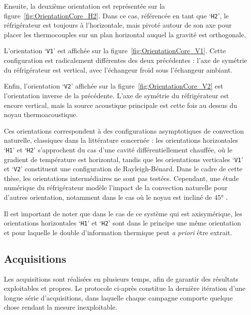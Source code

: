 Ensuite, la deuxième orientation est représentée sur la figure~\ref{fig:OrientationCore_H2}. Dans ce cas, référencée en tant que `\texttt{H2}', le réfrigérateur est toujours à l'horizontale, mais pivoté autour de son axe pour placer les thermocouples sur un plan horizontal auquel la gravité est orthogonale.\smallskip

L'orientation `\texttt{V1}' est affichée sur la figure~\ref{fig:OrientationCore_V1}. Cette configuration est radicalement différentes des deux précédentes : l'axe de symétrie du réfrigérateur est vertical, avec l'échangeur froid sous l'échangeur ambiant.\smallskip

Enfin, l'orientation `\texttt{V2}' affichée sur la figure~\ref{fig:OrientationCore_V2} est l'orientation inverse de la précédente. L'axe de symétrie du réfrigérateur est encore vertical, mais la source acoustique principale est cette fois au dessus du noyau thermoacoustique.\medskip

Ces orientations correspondent à des configurations asymptotiques de convection naturelle, classiques dans la littérature concernée : les orientations horizontales `\texttt{H1}' et `\texttt{H2}' s'approchent du cas d'une cavité différentiellement chauffée, où le gradient de température est horizontal, tandis que les orientations verticales `\texttt{V1}' et `\texttt{V2}' constituent une configuration de Rayleigh-Bénard. Dans le cadre de cette thèse, les orientations intermédiaires ne sont pas testées. Cependant, une étude numérique du réfrigérateur modèle l'impact de la convection naturelle pour d'autres orientation, notamment dans le cas où le noyau est incliné de \ang{45} \cite{baltean_gravity_2025}.\bigskip

Il est important de noter que dans le cas de ce système qui est axisymérique, les orientations horizontales `\texttt{H1}' et `\texttt{H2}' sont dans le principe une même orientation et pour laquelle le double d'information thermique peut \textit{a priori} être extrait.\medskip




\subsection{Acquisitions}
Les acquisitions sont réalisées en plusieurs temps, afin de garantir des résultats exploitables et propres. Le protocole ci-après constitue la dernière itération d'une longue série d'acquisitions, dans laquelle chaque campagne comporte quelque chose rendant la mesure inexploitable.

